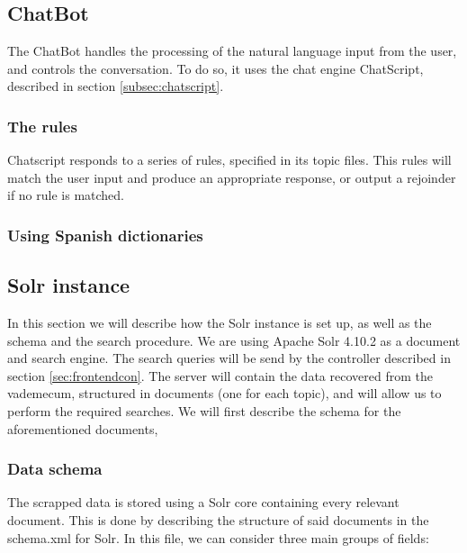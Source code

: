 \subsection{ChatBot}
\label{sec:chatbot}

The ChatBot handles the processing of the natural language input from the user, and controls the conversation. To do so, it uses the chat engine ChatScript, described in section \ref{subsec:chatscript}.

\subsubsection{The rules}

Chatscript responds to a series of rules, specified in its topic files. This rules will match the user input and produce an appropriate response, or output a rejoinder if no rule is matched.

\subsubsection{Using Spanish dictionaries}


\subsection{Solr instance}
\label{sec:solr}

In this section we will describe how the Solr instance is set up, as well as the schema and the search procedure. We are using Apache Solr 4.10.2 as a document and search engine. The search queries will be send by the controller described in section \ref{sec:frontendcon}. The server will contain the data recovered from the vademecum, structured in documents (one for each topic), and will allow us to perform the required searches. We will first describe the schema for the aforementioned documents, 



\subsubsection{Data schema}

The scrapped data is stored using a Solr core containing every relevant document. This is done by describing the structure of said documents in the schema.xml for Solr. In this file, we can consider three main groups of fields:


